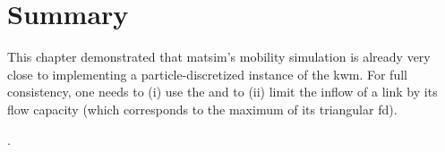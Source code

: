 \section{\label{sec:kinematicwaves-summary}Summary}
This chapter demonstrated that \gls{matsim}'s mobility simulation is already
very close to implementing a particle-discretized instance of the
\gls{kwm}. For full consistency, one needs to (i) use the 
and to (ii) limit the inflow of a link by its flow capacity (which
corresponds to the maximum of its triangular \gls{fd}). 


.

